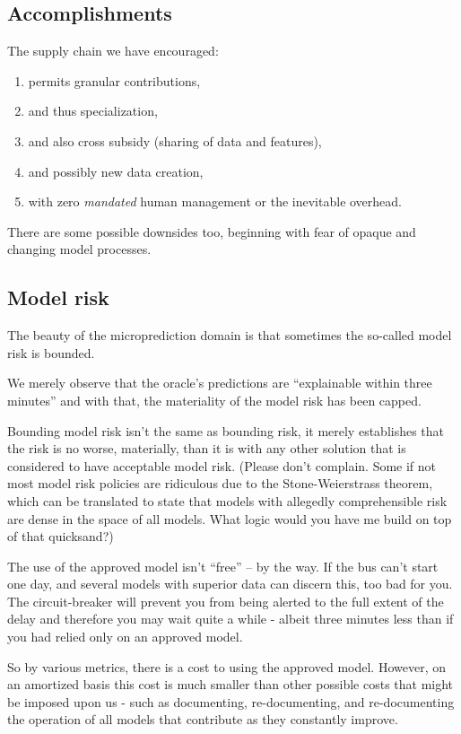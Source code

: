 \subsection{Accomplishments}

The supply chain we have encouraged:
\begin{enumerate}
    \item permits granular contributions,
    \item and thus specialization, 
    \item and also cross subsidy (sharing of data and features),
    \item and possibly new data creation,
    \item with zero {\em mandated} human management or the inevitable overhead. 
\end{enumerate}
There are some possible downsides too, beginning with fear of opaque and changing model processes.  

\subsection{Model risk}

The beauty of the microprediction domain is that sometimes the so-called model risk is bounded. 

We merely observe that the oracle's predictions are ``explainable within three minutes'' and with that, the materiality of the model risk has been capped.

Bounding model risk isn't the same as bounding risk, it merely establishes that the risk is no worse, materially, than it is with any other solution that is considered to have acceptable model risk. (Please don't complain. Some if not most model risk policies are ridiculous due to the Stone-Weierstrass theorem, which can be translated to state that models with allegedly comprehensible risk are dense in the space of all models. What logic would you have me build on top of that quicksand?)

The use of the approved model isn't ``free'' -- by the way. If the bus can't start one day, and several models with superior data can discern this, too bad for you. The circuit-breaker will prevent you from being alerted to the full extent of the delay and therefore you may wait quite a while - albeit three minutes less than if you had relied only on an approved model.  

So by various metrics, there is a cost to using the approved model. However, on an amortized basis this cost is much smaller than other possible costs that might be imposed upon us - such as documenting, re-documenting, and re-documenting the operation of all models that contribute as they constantly improve. 


